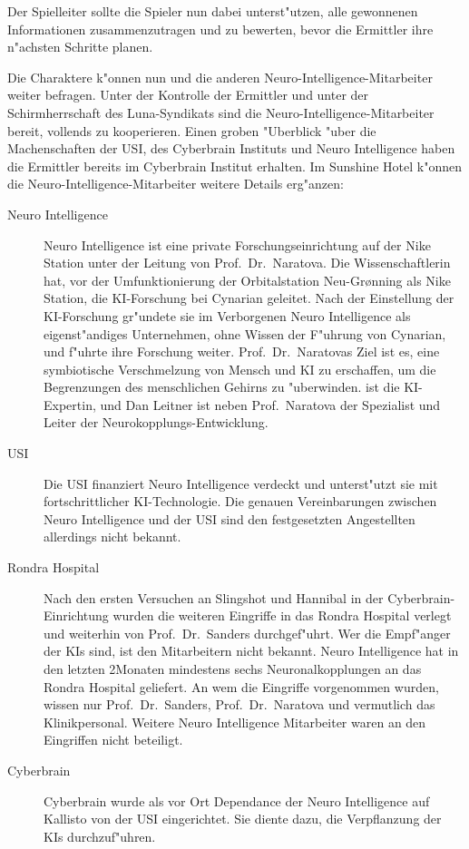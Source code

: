 Der Spielleiter sollte die Spieler nun dabei unterst"utzen, alle gewonnenen Informationen zusammenzutragen und zu bewerten, bevor die Ermittler ihre n"achsten Schritte planen.

Die Charaktere k"onnen nun \ml{} und die anderen Neuro-Intelligence-Mitarbeiter weiter befragen. Unter der Kontrolle der Ermittler und unter der Schirmherrschaft des Luna-Syndikats sind die Neuro-Intelligence-Mitarbeiter bereit, vollends zu kooperieren. Einen groben "Uberblick "uber die Machenschaften der USI, des Cyberbrain Instituts und Neuro Intelligence haben die Ermittler bereits im Cyberbrain Institut erhalten. Im Sunshine Hotel k"onnen die Neuro-Intelligence-Mitarbeiter weitere Details erg"anzen:

\begin{description}
	\item[Neuro Intelligence] Neuro Intelligence ist eine private Forschungseinrichtung auf der Nike Station unter der Leitung von 
		Prof.~Dr.~Naratova. Die Wissenschaftlerin hat, vor der Umfunktionierung der Orbitalstation Neu-Gr{\o}nning als Nike Station, die KI-Forschung bei Cynarian geleitet. Nach der Einstellung der KI-Forschung gr"undete sie im Verborgenen Neuro Intelligence als eigenst"andiges Unternehmen, ohne Wissen der F"uhrung von Cynarian, und f"uhrte ihre Forschung weiter. Prof.~Dr.~Naratovas Ziel ist es, eine symbiotische Verschmelzung von Mensch und KI zu erschaffen, um die Begrenzungen des menschlichen Gehirns zu "uberwinden. \ml{} ist die KI-Expertin, und Dan Leitner ist neben Prof.~Naratova der Spezialist und Leiter der Neurokopplungs-Entwicklung.
	\item[USI] Die USI finanziert Neuro Intelligence verdeckt und unterst"utzt sie mit fortschrittlicher KI-Technologie. Die genauen 
		Vereinbarungen zwischen Neuro Intelligence und der USI sind den festgesetzten Angestellten allerdings nicht bekannt.		
	\item[Rondra Hospital] Nach den ersten Versuchen an Slingshot und Hannibal in der Cyberbrain-Einrichtung wurden die weiteren Eingriffe 	
		in das Rondra Hospital verlegt und weiterhin von Prof.~Dr.~Sanders durchgef"uhrt. Wer die Empf"anger der KIs sind, ist den Mitarbeitern nicht bekannt. Neuro Intelligence hat in den letzten 2\half Monaten mindestens sechs Neuronalkopplungen an das Rondra Hospital geliefert. An wem die Eingriffe vorgenommen wurden, wissen nur Prof.~Dr.~Sanders, Prof.~Dr.~Naratova und vermutlich das Klinikpersonal. Weitere Neuro Intelligence Mitarbeiter waren an den Eingriffen nicht beteiligt.		
	\item[Cyberbrain] Cyberbrain wurde als vor Ort Dependance der Neuro Intelligence auf Kallisto von der USI eingerichtet. Sie diente 		
		dazu, die Verpflanzung der KIs durchzuf"uhren.
\end{description}	

